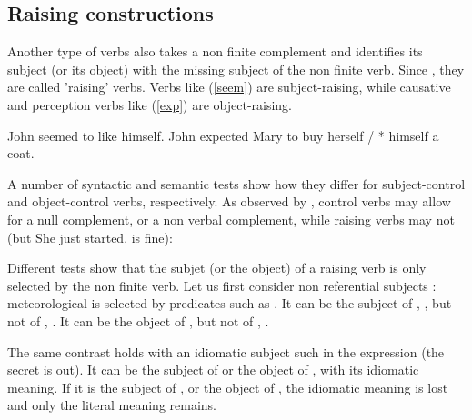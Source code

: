 \documentclass[output=paper]{langsci/langscibook}
\begin{document}
\subsection{Raising constructions}

Another type of verbs also takes a non finite complement and identifies its subject (or its object) with the missing subject of the non finite verb. Since \citet{Postal1974}, they are called 'raising' verbs. Verbs like  (\ref{seem}) are subject-raising, while
causative and perception verbs like  (\ref{exp}) are object-raising.
\begin{exe}
	\ex \begin{xlist}
	\ex John seemed to like himself.\label{seem}
\ex  John expected Mary to buy herself / * himself a coat. \label{exp}
\end{xlist}
 \end{exe}
 
 A number of syntactic and semantic tests show how they differ for subject-control and object-control verbs, respectively. As observed by \citet{Jacobson1990}, control verbs may allow for a null complement, or a non verbal complement, while raising verbs may not (but She just started. is fine):

\eal
{}
\zl
 
 Different tests show that the subjet (or the object) of a raising verb is only selected by the non
 finite verb. Let us first consider non referential subjects : meteorological  is selected
 by predicates such as . It can be the subject of , , but not of
 , . It can be the object of ,  but not of , .
	
\eal
{}
\zl
\eal
{}
\zl
 	
 The same contrast holds with an idiomatic subject such  in the expression  (the secret is out). It can be the subject of  or the object of , with its idiomatic meaning. If it is the subject of , or the object of , the idiomatic meaning is lost and only the literal meaning remains.
 
\eal
\judgewidth{\#}
\zl
\end{document}
